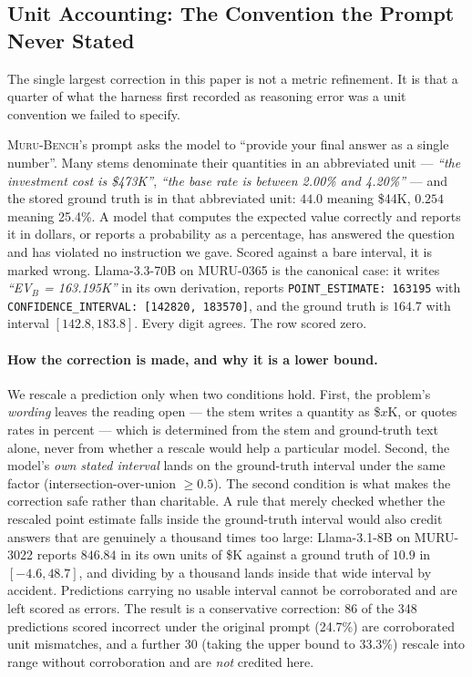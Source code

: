 \documentclass{article}
\newcommand{\muru}{\textsc{Muru-Bench}}
\begin{document}
\subsection{Unit Accounting: The Convention the Prompt Never Stated}
\label{sec:real_llm_units}

The single largest correction in this paper is not a metric refinement. It is that a quarter of what the harness first recorded as reasoning error was a unit convention we failed to specify.

\muru{}'s prompt asks the model to ``provide your final answer as a single number''. Many stems denominate their quantities in an abbreviated unit --- \emph{``the investment cost is \$473K''}, \emph{``the base rate is between 2.00\% and 4.20\%''} --- and the stored ground truth is in that abbreviated unit: $44.0$ meaning \$44K, $0.254$ meaning 25.4\%. A model that computes the expected value correctly and reports it in dollars, or reports a probability as a percentage, has answered the question and has violated no instruction we gave. Scored against a bare interval, it is marked wrong. Llama-3.3-70B on MURU-0365 is the canonical case: it writes \emph{``EV$_B$ = 163.195K''} in its own derivation, reports \texttt{POINT\_ESTIMATE: 163195} with \texttt{CONFIDENCE\_INTERVAL: [142820, 183570]}, and the ground truth is $164.7$ with interval $[142.8, 183.8]$. Every digit agrees. The row scored zero.

\paragraph{How the correction is made, and why it is a lower bound.} We rescale a prediction only when two conditions hold. First, the problem's \emph{wording} leaves the reading open --- the stem writes a quantity as \$$x$K, or quotes rates in percent --- which is determined from the stem and ground-truth text alone, never from whether a rescale would help a particular model. Second, the model's \emph{own stated interval} lands on the ground-truth interval under the same factor (intersection-over-union $\geq 0.5$). The second condition is what makes the correction safe rather than charitable. A rule that merely checked whether the rescaled point estimate falls inside the ground-truth interval would also credit answers that are genuinely a thousand times too large: Llama-3.1-8B on MURU-3022 reports $846.84$ in its own units of \$K against a ground truth of $10.9$ in $[-4.6, 48.7]$, and dividing by a thousand lands inside that wide interval by accident. Predictions carrying no usable interval cannot be corroborated and are left scored as errors. The result is a conservative correction: 86 of the 348 predictions scored incorrect under the original prompt (24.7\%) are corroborated unit mismatches, and a further 30 (taking the upper bound to 33.3\%) rescale into range without corroboration and are \emph{not} credited here.
\end{document}
